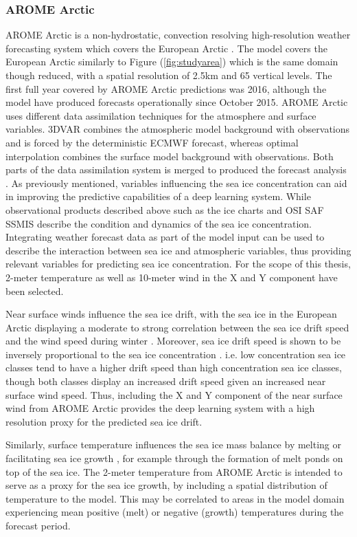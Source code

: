 \documentclass[../main/thesis.tex]{subfiles}
\begin{document}
\subsubsection{AROME Arctic}
\label{sec:arome}
AROME Arctic is a non-hydrostatic, convection resolving high-resolution weather forecasting system which covers the European Arctic \citep{Mueller2017}. The model covers the European Arctic similarly to Figure (\ref{fig:studyarea}) which is the same domain though reduced, with a spatial resolution of 2.5km and 65 vertical levels. The first full year covered by AROME Arctic predictions was 2016, although the model have produced forecasts operationally since October 2015. AROME Arctic uses different data assimilation techniques for the atmosphere and surface variables. 3DVAR combines the atmospheric model background with observations and is forced by the deterministic ECMWF forecast, whereas optimal interpolation combines the surface model background with observations. Both parts of the data assimilation system is merged to produced the forecast analysis \citep{Mueller2017}. As previously mentioned, variables influencing the sea ice concentration can aid in improving the predictive capabilities of a deep learning system. While observational products described above such as the ice charts \citep{Dinessen2020} and OSI SAF SSMIS \citep{Tonboe2017} describe the condition and dynamics of the sea ice concentration. Integrating weather forecast data as part of the model input can be used to describe the interaction between sea ice and atmospheric variables, thus providing relevant variables for predicting sea ice concentration. For the scope of this thesis, 2-meter temperature as well as 10-meter wind in the X and Y component have been selected.

Near surface winds influence the sea ice drift, with the sea ice in the European Arctic displaying a moderate to strong correlation between the sea ice drift speed and the wind speed during winter \citep{Spreen2011}. Moreover, sea ice drift speed is shown to be inversely proportional to the sea ice concentration \citep{Yu2020}. i.e. low concentration sea ice classes tend to have a higher drift speed than high concentration sea ice classes, though both classes display an increased drift speed given an increased near surface wind speed. Thus, including the X and Y component of the near surface wind from AROME Arctic provides the deep learning system with a high resolution proxy for the predicted sea ice drift. 

Similarly, surface temperature influences the sea ice mass balance by melting or facilitating sea ice growth \citep{Hibler1979}, for example through the formation of melt ponds on top of the sea ice. The 2-meter temperature from AROME Arctic is intended to serve as a proxy for the sea ice growth, by including a spatial distribution of temperature to the model. This may be correlated to areas in the model domain experiencing mean positive (melt) or negative (growth) temperatures during the forecast period.
\end{document}
